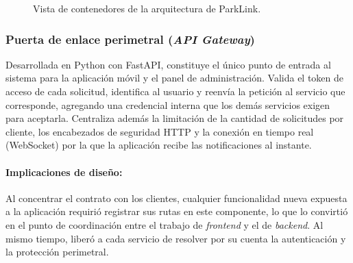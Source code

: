 \begin{figure}[H]
{}
\caption{Vista de contenedores de la arquitectura de ParkLink.}
\label{fig:arquitectura}
\end{figure}

\subsubsection{Puerta de enlace perimetral (\textit{API Gateway})}

Desarrollada en Python con FastAPI, constituye el único punto de entrada al sistema para la aplicación móvil y el panel de administración. Valida el token de acceso de cada solicitud, identifica al usuario y reenvía la petición al servicio que corresponde, agregando una credencial interna que los demás servicios exigen para aceptarla. Centraliza además la limitación de la cantidad de solicitudes por cliente, los encabezados de seguridad HTTP y la conexión en tiempo real (WebSocket) por la que la aplicación recibe las notificaciones al instante.

\paragraph{Implicaciones de diseño:} Al concentrar el contrato con los clientes, cualquier funcionalidad nueva expuesta a la aplicación requirió registrar sus rutas en este componente, lo que lo convirtió en el punto de coordinación entre el trabajo de \textit{frontend} y el de \textit{backend}. Al mismo tiempo, liberó a cada servicio de resolver por su cuenta la autenticación y la protección perimetral.

